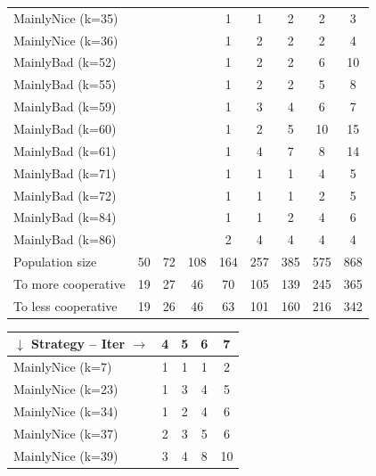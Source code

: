\documentclass[journal,10pt,twoside]{IEEEtran}
\begin{document}
\begin{table}[ht]
\begin{minipage}{.55\textwidth}
\begin{tabular}{l|cccccccc}
        MainlyNice (k=35)    &     &     &      &    1 &    1 &    2 &    2 &    3 \\
        MainlyNice (k=36)    &     &     &      &    1 &    2 &    2 &    2 &    4 \\
        MainlyBad (k=52)     &     &     &      &    1 &    2 &    2 &    6 &   10 \\
        MainlyBad (k=55)     &     &     &      &    1 &    2 &    2 &    5 &    8 \\
        MainlyBad (k=59)     &     &     &      &    1 &    3 &    4 &    6 &    7 \\
        MainlyBad (k=60)     &     &     &      &    1 &    2 &    5 &   10 &   15 \\
        MainlyBad (k=61)     &     &     &      &    1 &    4 &    7 &    8 &   14 \\
        MainlyBad (k=71)     &     &     &      &    1 &    1 &    1 &    4 &    5 \\
        MainlyBad (k=72)     &     &     &      &    1 &    1 &    1 &    2 &    5 \\
        MainlyBad (k=84)     &     &     &      &    1 &    1 &    2 &    4 &    6 \\
        MainlyBad (k=86)     &     &     &      &    2 &    4 &    4 &    4 &    4 \\ \midrule
        Population size      &  50 &  72 &  108 &  164 &  257 &  385 &  575 &  868 \\
        To more cooperative  &  19 &  27 &   46 &   70 &  105 &  139 &  245 &  365 \\
        To less cooperative  &  19 &  26 &   46 &   63 &  101 &  160 &  216 &  342 \\ \bottomrule
    \end{tabular}
    \end{minipage} \quad
    \begin{minipage}{.35\textwidth}
    \begin{tabular}{l|cccc} \toprule
        $\downarrow$ Strategy -- Iter $\rightarrow$ & 4 & 5 & 6 & 7 \\ \midrule
        MainlyNice (k=7)     &    1 &    1 &    1 &    2 \\
        MainlyNice (k=23)    &    1 &    3 &    4 &    5 \\
        MainlyNice (k=34)    &    1 &    2 &    4 &    6 \\
        MainlyNice (k=37)    &    2 &    3 &    5 &    6 \\
        MainlyNice (k=39)    &    3 &    4 &    8 &   10 \\

\end{tabular}
\end{minipage}
\end{table}
\end{document}
